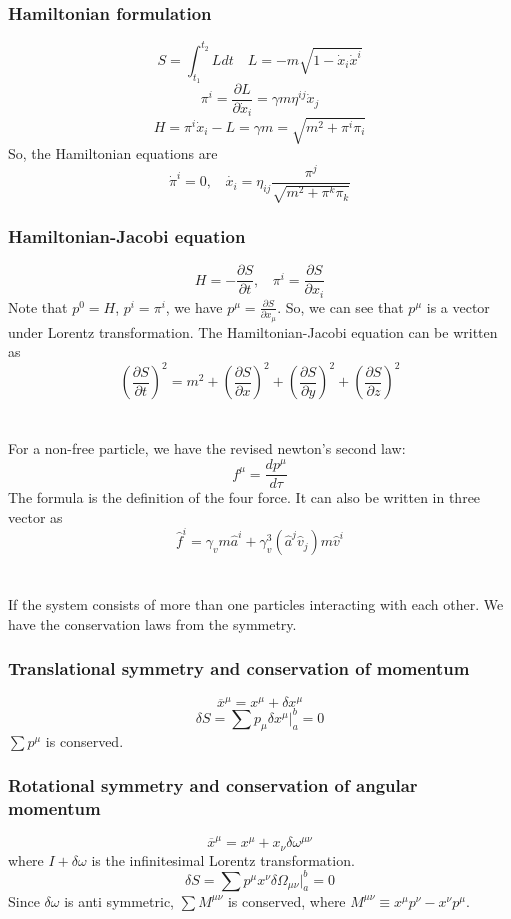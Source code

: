\subsubsection{Hamiltonian formulation}
\[S = \int_{t_1}^{t_2} L dt \quad L = - m \sqrt{1-\dot{x}_i\dot{x}^i}\]
\[\pi^i = \frac{\partial L}{\partial \dot{x}_i} = \gamma m \eta^{ij}\dot{x}_j\]
\[H = \pi^i \dot{x}_i - L = \gamma m = \sqrt{m^2 + \pi^i \pi_i}\]
So, the Hamiltonian equations are
\[\dot{\pi}^i = 0, \ \ \ \ \dot{x_i} = \eta_{ij}\frac{\pi^j}{\sqrt{m^2 + \pi^k \pi_k}}\]
\subsubsection{Hamiltonian-Jacobi equation}
\[H = -\frac{\partial S}{\partial t}, \ \ \ \ \pi^i = \frac{\partial S}{\partial x_i}\]
Note that $p^0 = H$, $p^i = \pi^i$, we have $p^{\mu} = \frac{\partial S}{\partial x_{\mu}}$. So, we can see that $p^{\mu}$ is a vector under Lorentz transformation. The Hamiltonian-Jacobi equation can be written as
\[(\frac{\partial S}{\partial t})^2 = m^2 + (\frac{\partial S}{\partial x})^2 + (\frac{\partial S}{\partial y})^2 + (\frac{\partial S}{\partial z})^2\]
\\ \\
For a non-free particle, we have the revised newton's second law:
\[f^{\mu} = \frac{dp^{\mu}}{d\tau}\]
The formula is the definition of the four force. It can also be written in three vector as
\[\hat{f}^i = \gamma_v m \hat{a}^i + \gamma_v^3 (\hat{a}^j \hat{v}_j) m \hat{v}^i\]
\\ \\
If the system consists of more than one particles interacting with each other. We have the conservation laws from the symmetry.
\subsubsection{Translational symmetry and conservation of momentum}
\[\overline{x}^{\mu} = x^{\mu} + \delta x^{\mu}\]
\[\delta S = \sum p_{\mu} \delta x^{\mu}|_a^b = 0 \]
$\sum p^{\mu}$ is conserved.
\subsubsection{Rotational symmetry and conservation of angular momentum}
\[\overline{x}^{\mu} = x^{\mu} + x_{\nu}\delta \omega^{\mu \nu}\]
where $I+\delta \omega$ is the infinitesimal Lorentz transformation.
\[\delta S = \sum p^{\mu} x^{\nu} \delta \Omega_{\mu \nu}|_a^b = 0 \]
Since $\delta \omega$ is anti symmetric, $\sum M^{\mu \nu} $ is conserved, where $M^{\mu \nu} \equiv x^{\mu}p^{\nu} - x^{\nu}p^{\mu}$.

